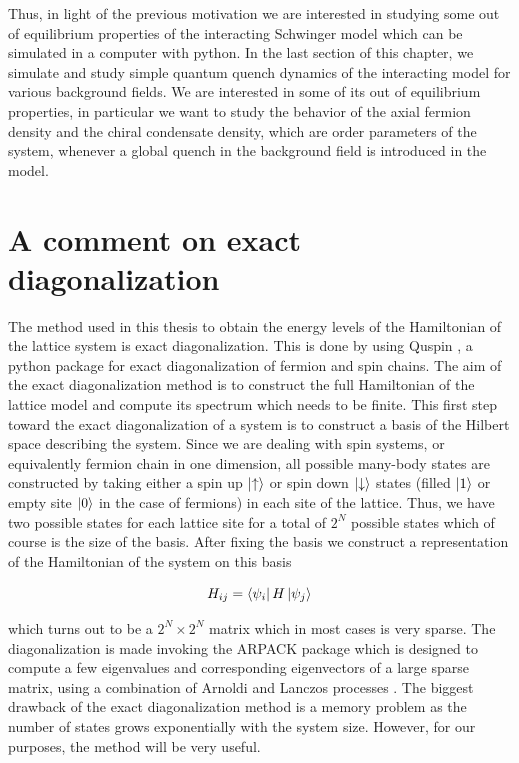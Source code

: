 Thus, in light of the previous motivation we are interested in studying some out of equilibrium properties of the interacting Schwinger model which can be simulated in a computer with python. In the last section of this chapter, we simulate and study simple quantum quench dynamics of the interacting model for various background fields. We are interested in some of its out of equilibrium properties, in particular we want to study the behavior of the axial fermion density and the chiral condensate density, which are order parameters of the system, whenever a global quench in the background field is introduced in the model.\\



 
\section{A comment on exact diagonalization}

The method used in this thesis to obtain the energy levels of the Hamiltonian of the lattice system is exact diagonalization. This is done by using Quspin \cite{Weinberg2017, Weinberg2018}, a python package for exact diagonalization of fermion and spin chains. The aim of the exact diagonalization method is to construct the full Hamiltonian of the lattice model and compute its spectrum which needs to be finite. This first step toward the exact diagonalization of a system is to construct a basis of the Hilbert space describing the system. Since we are dealing with spin systems, or equivalently fermion chain in one dimension, all possible many-body states are constructed by taking either a spin up $\ket{\uparrow}$ or spin down $\ket{\downarrow}$ states (filled $\ket{1}$ or empty site $\ket{0}$ in the case of fermions) in each site of the lattice. Thus, we have two possible states for each lattice site for a total of $2^N$ possible states which of course is the size of the basis. After fixing the basis we construct a representation of the Hamiltonian of the system on this basis 

\begin{equation}
H_{ij} = \bra{\psi_i}H\ket{\psi_j}
\end{equation}

which turns out to be a $2^N \times 2^N$ matrix which in most cases is very sparse. The diagonalization is made invoking the ARPACK package which is designed to compute a few eigenvalues and corresponding eigenvectors of a large sparse matrix, using a combination of Arnoldi and Lanczos processes \cite{arpack}. The biggest drawback of the exact diagonalization method is a memory problem as the number of states grows exponentially with the system size. However, for our purposes, the method will be very useful.



